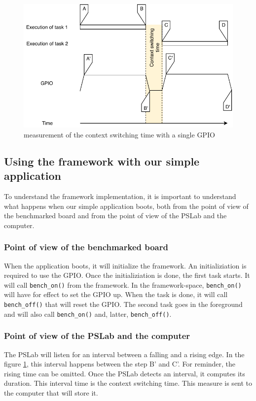 \begin{figure}[!ht]
  \centering
  \includegraphics[scale=1]{assets/external-framework-context-switching-time-measurement.pdf}
  \caption{\label{fig:external-framework-context-switching-time-measurement}measurement of the context switching time with a single GPIO}
\end{figure}

\subsection{Using the framework with our simple application}

To understand the framework implementation, it is important to understand what happens when our simple application boots, 
  both from the point of view of the benchmarked board and from the point of view of the PSLab and the computer.

\subsubsection{Point of view of the benchmarked board}
When the application boots, it will initialize the framework.
An initializiation is required to use the GPIO.
Once the initializiation is done, the first task starts.
It will call \texttt{bench\_on()} from the framework.
In the framework-space, \texttt{bench\_on()} will have for effect to set the GPIO up.
When the task is done, it will call \texttt{bench\_off()} that will reset the GPIO.
The second task goes in the foreground and will also call \texttt{bench\_on()} and, latter, \texttt{bench\_off()}.

\subsubsection{Point of view of the PSLab and the computer}
The PSLab will listen for an interval between a falling and a rising edge.
In the figure \ref{fig:external-framework-context-switching-time-measurement}, this interval happens between the step B' and C'.
For reminder, the rising time can be omitted.
Once the PSLab detects an interval, it computes its duration.
This interval time is the context switching time.
This measure is sent to the computer that will store it.

